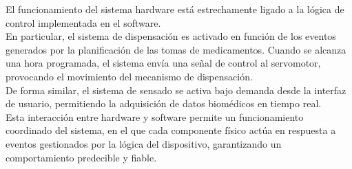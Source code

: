 El funcionamiento del sistema hardware está estrechamente ligado a la lógica de control implementada en el software.\\

En particular, el sistema de dispensación es activado en función de los eventos generados por la planificación de las tomas de medicamentos. Cuando se alcanza una hora programada, el sistema envía una señal de control al servomotor, provocando el movimiento del mecanismo de dispensación.\\

De forma similar, el sistema de sensado se activa bajo demanda desde la interfaz de usuario, permitiendo la adquisición de datos biomédicos en tiempo real.\\

Esta interacción entre hardware y software permite un funcionamiento coordinado del sistema, en el que cada componente físico actúa en respuesta a eventos gestionados por la lógica del dispositivo, garantizando un comportamiento predecible y fiable.
